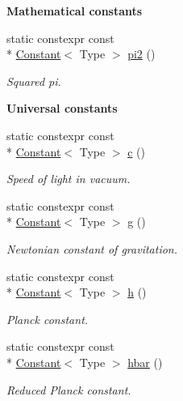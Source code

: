 \begin{Indent}{\bf Mathematical constants}
\begin{DoxyCompactItemize}
static constexpr const \\*
\hyperlink{exceptionmagrathea_1_1Constant}{Constant}$<$ Type $>$ \hyperlink{exceptionmagrathea_1_1Constants_afe1cfe53d2dee4200c0f151e0092fd4d}{pi2} ()
\begin{DoxyCompactList}\small\item\em Squared pi. \end{DoxyCompactList}\end{DoxyCompactItemize}
\end{Indent}
\begin{Indent}{\bf Universal constants}\par
\begin{DoxyCompactItemize}
\item 
static constexpr const \\*
\hyperlink{exceptionmagrathea_1_1Constant}{Constant}$<$ Type $>$ \hyperlink{exceptionmagrathea_1_1Constants_ac90521c97d3092cfc8ea0da4e2c31f4d}{c} ()
\begin{DoxyCompactList}\small\item\em Speed of light in vacuum. \end{DoxyCompactList}\item 
static constexpr const \\*
\hyperlink{exceptionmagrathea_1_1Constant}{Constant}$<$ Type $>$ \hyperlink{exceptionmagrathea_1_1Constants_ac90c08bcfa5fb563872123cb2cc1049c}{g} ()
\begin{DoxyCompactList}\small\item\em Newtonian constant of gravitation. \end{DoxyCompactList}\item 
static constexpr const \\*
\hyperlink{exceptionmagrathea_1_1Constant}{Constant}$<$ Type $>$ \hyperlink{exceptionmagrathea_1_1Constants_a55356d4ac07c0b95089c70f8d7a67794}{h} ()
\begin{DoxyCompactList}\small\item\em Planck constant. \end{DoxyCompactList}\item 
static constexpr const \\*
\hyperlink{exceptionmagrathea_1_1Constant}{Constant}$<$ Type $>$ \hyperlink{exceptionmagrathea_1_1Constants_a99e55c373d89ffcc2a1497ff3e084fae}{hbar} ()
\begin{DoxyCompactList}\small\item\em Reduced Planck constant. \end{DoxyCompactList}\item 

\end{DoxyCompactItemize}
\end{Indent}
